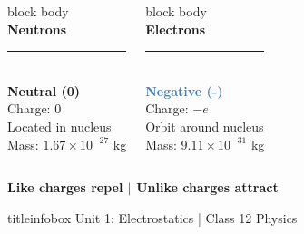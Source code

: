 \begin{frame}
\begin{columns}[T]
    \begin{beamercolorbox}[wd=\textwidth,rounded=true,shadow=true,center]{block body}
    \vspace{0.15cm}
    \centering
    {\Large\textcolor{coolgray}{}}\\
    \vspace{0.1cm}
    \textbf{\Large\textsf{Neutrons}}\\
    \vspace{0.05cm}
    {\color{warmgray}\rule{0.6\textwidth}{1.5pt}}\\
    \vspace{0.1cm}
    \textcolor{coolgray}{\textbf{Neutral (0)}}\\
    {\small Charge: $0$}\\
    {\scriptsize Located in nucleus}\\
    {\scriptsize Mass: $1.67 \times 10^{-27}$ kg}
    \vspace{0.15cm}
    \end{beamercolorbox}
    
    \begin{beamercolorbox}[wd=\textwidth,rounded=true,shadow=true,center]{block body}
    \vspace{0.15cm}
    \centering
    {\Large\textcolor{steelblue}{}}\\
    \vspace{0.1cm}
    \textbf{\Large\textsf{Electrons}}\\
    \vspace{0.05cm}
    {\color{steelblue}\rule{0.6\textwidth}{1.5pt}}\\
    \vspace{0.1cm}
    \textcolor{steelblue}{\textbf{Negative (-)}}\\
    {\small Charge: $-e$}\\
    {\scriptsize Orbit around nucleus}\\
    {\scriptsize Mass: $9.11 \times 10^{-31}$ kg}
    \vspace{0.15cm}
    \end{beamercolorbox}
\end{columns}

\vspace{0.4cm}

\begin{examplebox}
\centering
\Large\textbf{\textcolor{importantRed}{Like charges repel} \quad $\vert$ \quad \textcolor{familiarGreen}{Unlike charges attract}}
\end{examplebox}

\vfill

\begin{beamercolorbox}[wd=\textwidth,ht=0.5cm,dp=0.1cm,center]{titleinfobox}
    \small\color{coolgray} Unit 1: Electrostatics | Class 12 Physics
\end{beamercolorbox}
\end{frame}

